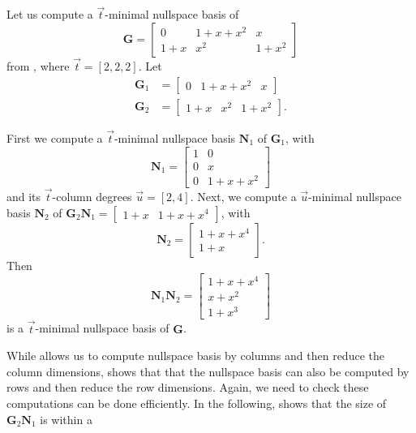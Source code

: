 \begin{exmp}
Let us compute a $\vec{t}$-minimal nullspace basis of 
\[
\mathbf{G}=\left[\begin{array}{ccc}
0 & 1+x+x^{2} & x\\
1+x & x^{2} & 1+x^{2}
\end{array}\right]
\]
 from , where $\vec{t}=\left[2,2,2\right]$.
Let 
\begin{align*}
\mathbf{G}_{1} & =\left[\begin{array}{ccc}
0 & 1+x+x^{2} & x\end{array}\right]\\
\mathbf{G}_{2} & =\left[\begin{array}{ccc}
1+x & x^{2} & 1+x^{2}\end{array}\right].
\end{align*}


First we compute a $\vec{t}$-minimal nullspace basis $\mathbf{N}_{1}$
of $\mathbf{G}_{1}$, with 
\[
\mathbf{N}_{1}=\left[\begin{array}{cc}
1 & 0\\
0 & x\\
0 & 1+x+x^{2}
\end{array}\right]
\]
 and its $\vec{t}$-column degrees $\vec{u}=\left[2,4\right]$. Next,
we compute a $\vec{u}$-minimal nullspace basis $\mathbf{N}_{2}$
of $\mathbf{G}_{2}\mathbf{N}_{1}=\left[\begin{array}{cc}
1+x & 1+x+x^{4}\end{array}\right]$, with 
\[
\mathbf{N}_{2}=\begin{bmatrix}1+x+x^{4}\\
1+x
\end{bmatrix}.
\]
 Then 
\[
\mathbf{N}_{1}\mathbf{N}_{2}=\left[\begin{array}{c}
1+x+x^{4}\\
x+x^{2}\\
1+x^{3}
\end{array}\right]
\]
 is a $\vec{t}$-minimal nullspace basis of $\mathbf{G}$.
\end{exmp}
While  allows
us to compute nullspace basis by columns and then reduce the column
dimensions, 
shows that that the nullspace basis can also be computed by rows and
then reduce the row dimensions. Again, we need to check these computations
can be done efficiently. In the following, 
shows that the size of $\mathbf{G}_{2}\mathbf{N}_{1}$ is within a
